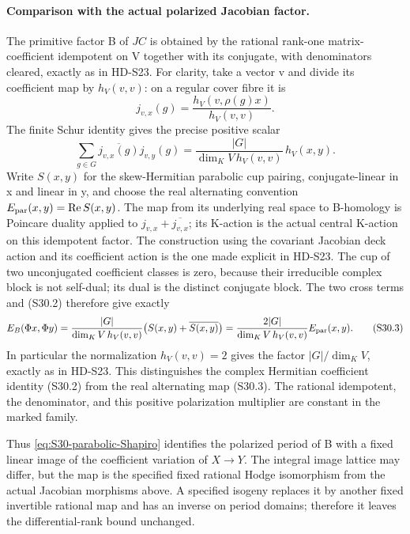 \paragraph{Comparison with the actual polarized Jacobian factor.}
The primitive factor B of \(JC\) is obtained by the rational
rank-one matrix-coefficient idempotent on V together with its
conjugate, with denominators cleared, exactly as in HD-S23.
For clarity, take a vector v and divide its coefficient map by
\(h_V(v,v)\): on a regular cover fibre it is
\[
                 j_{v,x}(g)
           =\frac{h_V(v,\rho(g)x)}{h_V(v,v)}.
\]
The finite Schur identity gives the precise positive scalar
\[
 \sum_{g\in G}\overline{j_{v,x}(g)}j_{v,y}(g)
       =\frac{|G|}{\dim_K V\,h_V(v,v)}\,h_V(x,y).
                                                               \tag{S30.2}
\]
Write \(S(x,y)\) for the skew-Hermitian parabolic cup pairing,
conjugate-linear in x and linear in y, and choose the real alternating
convention \(E_{\rm par}(x,y)=\operatorname{Re}S(x,y)\).
The map from its underlying real space to B-homology is Poincare
duality applied to \(j_{v,x}+\overline{j_{v,x}}\); its K-action
is the actual central K-action on this idempotent factor. The
construction using the covariant Jacobian deck action and its
coefficient action is the one made explicit in HD-S23. The cup of two
unconjugated coefficient classes is zero, because their irreducible
complex block is not self-dual; its dual is the distinct conjugate
block. The two cross terms and (S30.2) therefore give exactly
\[
 E_B(\Phi x,\Phi y)
  =\frac{|G|}{\dim_KV\,h_V(v,v)}
           \bigl(S(x,y)+\overline{S(x,y)}\bigr)
  =\frac{2|G|}{\dim_KV\,h_V(v,v)}E_{\rm par}(x,y).
                                                               \tag{S30.3}
\]
In particular the normalization \(h_V(v,v)=2\) gives the
factor \(|G|/\dim_KV\), exactly as in HD-S23. This distinguishes
the complex Hermitian coefficient identity (S30.2) from the real
alternating map (S30.3). The rational idempotent, the denominator, and
this positive polarization multiplier are constant in the marked family.

Thus \eqref{eq:S30-parabolic-Shapiro} identifies the polarized
period of B with a fixed linear image of the coefficient variation
of \(X\to Y\). The integral image lattice may differ, but the
map is the specified fixed rational Hodge isomorphism from the actual
Jacobian morphisms above. A specified isogeny replaces it by another
fixed invertible rational map and has an inverse on period domains;
therefore it leaves the differential-rank bound unchanged.

